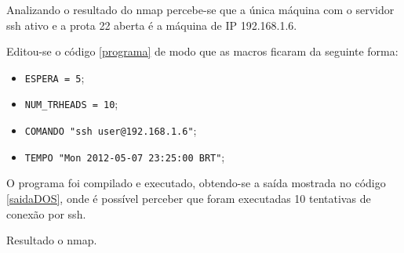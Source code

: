 \documentclass[12pt]{abnt}
\begin{document}
Analizando o resultado do nmap percebe-se que a única máquina com o servidor
ssh ativo e a prota 22 aberta é a máquina de IP 192.168.1.6.

Editou-se o código \ref{programa} de modo que as macros ficaram da seguinte forma:
\begin{itemize}

	\item \texttt{ESPERA = 5};

	\item \texttt{NUM\_TRHEADS = 10};

	\item \texttt{COMANDO "ssh user@192.168.1.6"};

	\item \texttt{TEMPO "Mon 2012-05-07 23:25:00 BRT"};

\end{itemize}

O programa foi compilado e executado, obtendo-se a saída mostrada no código \ref{saidaDOS},
onde é possível perceber que foram executadas 10 tentativas de conexão por ssh.

\renewcommand{\baselinestretch}{0.5}  %
\begin{codigo}[!htb]
   \tiny  %
   \caption{Resultado o nmap.}
   \label{saidaDOS}
\end{codigo}
\clearpage

\end{document}
